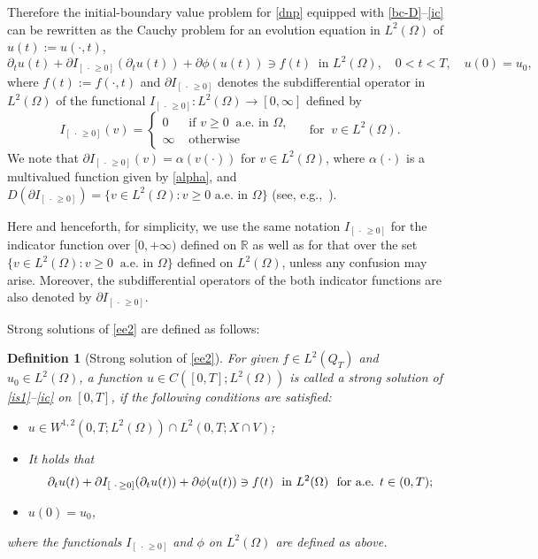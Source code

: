 \documentclass[reqno,10pt]{amsart}
\newtheorem{Def}[Th]{Definition}
\begin{document}
Therefore the initial-boundary value problem for \eqref{dnp} equipped
with \eqref{bc-D}--\eqref{ic} can
be rewritten as the Cauchy problem for an evolution equation in
$L^2(\Omega)$ of $u(t) := u(\cdot, t)$,
\begin{equation}\label{ee2}
 \partial_t u(t) + \partial {I_{[~\cdot\, \geq 0]}} (\partial_t u(t)) + \partial \phi(u(t))
  \ni f(t) \ \mbox{ in } L^2(\Omega), \quad 0 < t < T, \quad u(0) = u_0,
\end{equation}
where $f(t) := f(\cdot,t)$ and $\partial {I_{[~\cdot\, \geq 0]}}$ denotes the
subdifferential operator in $L^2(\Omega)$ of the functional ${I_{[~\cdot\, \geq 0]}} :
L^2(\Omega) \to [0,\infty]$ defined by
$$ 
{I_{[~\cdot\, \geq 0]}}(v) = \begin{cases}
	 0 &\mbox{ if } v \geq 0 \ \mbox{ a.e.~in } \Omega,\\
	 \infty &\mbox{ otherwise}
	\end{cases}
	\quad \mbox{ for } \ v \in L^2(\Omega).
$$
We note that $\partial {I_{[~\cdot\, \geq 0]}}(v) = \alpha(v(\cdot))$ for $v \in
L^2(\Omega)$, where $\alpha(\cdot)$ is a multivalued function given by
\eqref{alpha}, and $D(\partial {I_{[~\cdot\, \geq 0]}}) = \{ v \in L^2(\Omega) \colon v \geq
0 \mbox{ a.e.~in } \Omega\}$ (see, e.g.,~\cite{Bre73}). 

Here and henceforth, for simplicity, we use the same notation ${I_{[~\cdot\, \geq 0]}}$ for
the indicator function over $[0,+\infty)$ defined on $\mathbb R$ as well
as for that over the set $\{v \in L^2(\Omega)
\colon v \geq 0 \ \mbox{ a.e.~in } \Omega\}$ defined on $L^2(\Omega)$,
unless any confusion may arise. Moreover, the subdifferential operators
of the both indicator functions are also denoted by $\partial {I_{[~\cdot\, \geq 0]}}$.

Strong solutions of \eqref{ee2} are defined as follows:

\begin{Def}[Strong solution of \eqref{ee2}]\label{D:sol}
For given $f\in L^2(Q_T)$ and $u_0\in L^2(\Omega)$, a function $u \in
 C([0,T];L^2(\Omega))$ is called a \emph{strong solution} of
 \eqref{is1}--\eqref{ic} on $[0,T]$, if the following conditions are
 satisfied\/{\rm :}
\begin{itemize}
\item
     $u \in W^{1,2}(0,T;L^2(\Omega)) \cap L^2(0,T;X \cap
     V)$\/{\rm ;}
\item It holds that
     \begin{equation}\label{ee2-EQ}
      \partial_t u(t) + \partial {I_{[~\cdot\, \geq 0]}}(\partial_t u(t)) + \partial \phi(u(t))
     \ni f(t)
      \ \mbox{ in } L^2(\Omega) \ \mbox{ for a.e. } t \in (0,T)\/{\rm ;}
      \end{equation}
\item
     $u(0) = u_0$, 
\end{itemize}
where the functionals ${I_{[~\cdot\, \geq 0]}}$ and $\phi$ on $L^2(\Omega)$ are defined
 as above.
\end{Def}
\end{document}
